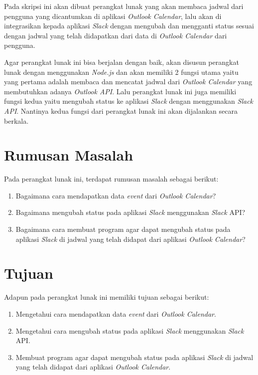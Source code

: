 Pada skripsi ini akan dibuat perangkat lunak yang akan membaca jadwal dari pengguna yang dicantumkan di aplikasi \textit{Outlook Calendar}, lalu akan di integrasikan kepada aplikasi \textit{Slack} dengan mengubah dan mengganti status sesuai dengan jadwal yang telah didapatkan dari data di \textit{Outlook Calendar} dari pengguna. 

Agar perangkat lunak ini bisa berjalan dengan baik, akan disusun perangkat lunak dengan menggunakan \textit{Node.js} dan akan memiliki 2 fungsi utama yaitu yang pertama adalah membaca dan mencatat jadwal dari \textit{Outlook Calendar} yang membutuhkan adanya \textit{Outlook API}. Lalu perangkat lunak ini juga memiliki fungsi kedua yaitu mengubah status ke aplikasi \textit{Slack} dengan menggunakan \textit{Slack API}. Nantinya kedua fungsi dari perangkat lunak ini akan dijalankan secara berkala. 

\section{Rumusan Masalah}
\label{sec:rumusan}
Pada perangkat lunak ini, terdapat rumusan masalah sebagai berikut:
\begin{enumerate}
	\item Bagaimana cara mendapatkan data \textit{event} dari \textit{Outlook Calendar}?
	\item Bagaimana mengubah status pada aplikasi \textit{Slack} menggunakan \textit{Slack} API?  
	\item Bagaimana cara membuat program agar dapat mengubah status pada aplikasi \textit{Slack} di jadwal yang telah didapat dari aplikasi \textit{Outlook Calendar}? 
	
\end{enumerate}

\section{Tujuan}
\label{sec:tujuan}
Adapun pada perangkat lunak ini memiliki tujuan sebagai berikut:
\begin{enumerate}
	\item Mengetahui cara mendapatkan data \textit{event} dari \textit{Outlook Calendar}.   
	\item Mengetahui cara mengubah status pada aplikasi \textit{Slack} menggunakan \textit{Slack} API. 
	\item Membuat program agar dapat mengubah status pada aplikasi \textit{Slack} di jadwal yang telah didapat dari aplikasi \textit{Outlook Calendar}.  
	
\end{enumerate}

